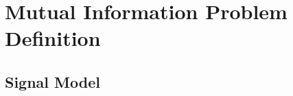 \documentclass{article}         %
\theoremstyle{definition}
\theoremstyle{remark}
\begin{document}
		
		\section{Mutual Information Problem Definition}\label{MIProblem}
		
		\subsection{Signal Model}
		
		
\end{document}
